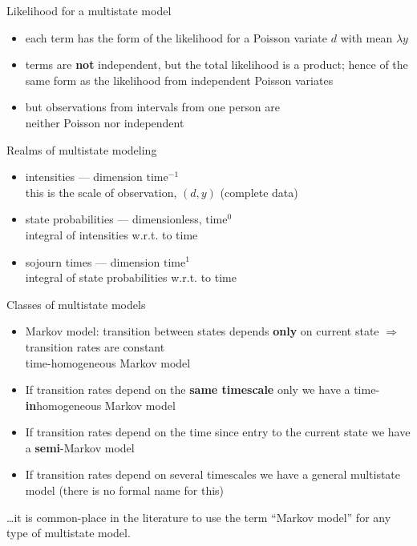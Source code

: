 \begin{frame}{Likelihood for a multistate model}
  \begin{itemize}
    \item each term has the form of the likelihood for a Poisson
      variate $d$ with mean $\lambda y$
  \item terms are \textbf{not} independent, but the total
    likelihood is a product; hence of the same form as the
    likelihood from independent Poisson variates
  \item but observations from intervals from one person are\\
    neither Poisson nor independent
  \end{itemize}
\end{frame}

\begin{frame}{Realms of multistate modeling}
  \begin{itemize}
  \item intensities --- dimension \alert<4>{$\textrm{time}^{-1}$}\\
    this is the scale of observation, $(d,y)$ (complete data)
  \item state probabilities --- dimensionless, \alert<4>{$\textrm{time}^{0}$}\\
    \alert<4>{integral} of intensities w.r.t. to time
  \item sojourn times --- dimension \alert<4>{$\textrm{time}^{1}$}\\ 
    \alert<4>{integral} of state probabilities w.r.t. to time
  \end{itemize}
\end{frame}

\begin{frame}{Classes of multistate models}
  \begin{itemize}
  \item Markov model: transition between states depends \textbf{only}
    on current state $\Rightarrow$ transition rates are constant\\
    \alert<5->{time-homogeneous Markov model}
  \item If transition rates depend on the \textbf{same timescale}
    only we have a \alert<5->{time-\textbf{in}homogeneous Markov model}
  \item If transition rates depend on the time since entry to the
    current state we have a \alert<5->{\textbf{semi}-Markov model}
  \item If transition rates depend on several timescales we have a
    \alert<5->{general multistate model} (there is no formal name for this)
  \end{itemize}
  \pause
  \ldots it is common-place in the literature to use the term ``Markov
  model'' for any type of multistate model.
\end{frame}

